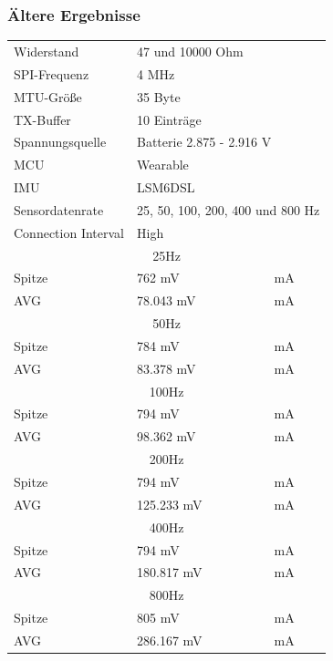 \subsubsection{Ältere Ergebnisse}
\begin{minipage}{\linewidth}
	\label{tab:aaaaaaaaaaaaaaaa}
	\begin{tabularx}{\linewidth}{|l|l|X|}
		Widerstand & \multicolumn{2}{l|}{47 und 10000 Ohm}\\
    SPI-Frequenz & \multicolumn{2}{l|}{4 MHz}\\
    MTU-Größe & \multicolumn{2}{l|}{35 Byte}\\
    TX-Buffer & \multicolumn{2}{l|}{10 Einträge}\\
    Spannungsquelle & \multicolumn{2}{l|}{Batterie 2.875 - 2.916 V}\\
    MCU & \multicolumn{2}{l|}{Wearable}\\
    IMU & \multicolumn{2}{l|}{LSM6DSL}\\
    Sensordatenrate & \multicolumn{2}{l|}{25, 50, 100, 200, 400 und 800 Hz}\\
    Connection Interval & \multicolumn{2}{l|}{High}\\
    \hline
    \multicolumn{3}{|c|}{25Hz}\\
    Spitze & 762 mV & mA\\
    AVG & 78.043 mV & mA\\
    \hline
    \multicolumn{3}{|c|}{50Hz}\\
    Spitze & 784 mV & mA\\
    AVG & 83.378 mV & mA\\
    \hline
    \multicolumn{3}{|c|}{100Hz}\\
    Spitze & 794 mV & mA\\
    AVG & 98.362 mV & mA\\
    \hline
    \multicolumn{3}{|c|}{200Hz}\\
    Spitze & 794 mV & mA\\
    AVG & 125.233 mV & mA\\
    \hline
    \multicolumn{3}{|c|}{400Hz}\\
    Spitze & 794 mV & mA\\
    AVG & 180.817 mV & mA\\
    \hline
    \multicolumn{3}{|c|}{800Hz}\\
    Spitze & 805 mV & mA\\
    AVG & 286.167 mV & mA\\
  \end{tabularx}
\end{minipage}\\\\



